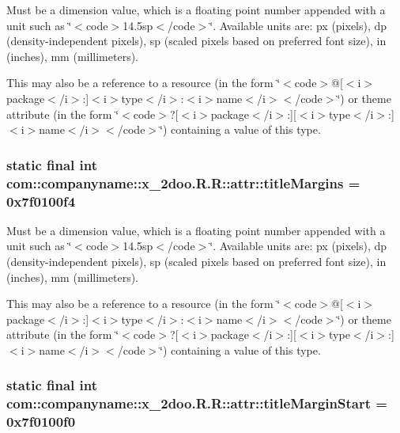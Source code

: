 Must be a dimension value, which is a floating point number appended with a unit such as \char`\"{}$<$code$>$14.5sp$<$/code$>$\char`\"{}. Available units are: px (pixels), dp (density-independent pixels), sp (scaled pixels based on preferred font size), in (inches), mm (millimeters). 

This may also be a reference to a resource (in the form \char`\"{}$<$code$>$@\mbox{[}$<$i$>$package$<$/i$>$:\mbox{]}$<$i$>$type$<$/i$>$:$<$i$>$name$<$/i$>$$<$/code$>$\char`\"{}) or theme attribute (in the form \char`\"{}$<$code$>$?\mbox{[}$<$i$>$package$<$/i$>$:\mbox{]}\mbox{[}$<$i$>$type$<$/i$>$:\mbox{]}$<$i$>$name$<$/i$>$$<$/code$>$\char`\"{}) containing a value of this type. \hypertarget{classcom_1_1companyname_1_1x__2doo_1_1_r_1_1attr_13a8e062a2cd0a3ea42fe3376622f46d}{
\subsubsection[{titleMargins}]{\setlength{\rightskip}{0pt plus 5cm}static final int com::companyname::x\_\-2doo.R.R::attr::titleMargins = 0x7f0100f4}}
\label{classcom_1_1companyname_1_1x__2doo_1_1_r_1_1attr_13a8e062a2cd0a3ea42fe3376622f46d}


Must be a dimension value, which is a floating point number appended with a unit such as \char`\"{}$<$code$>$14.5sp$<$/code$>$\char`\"{}. Available units are: px (pixels), dp (density-independent pixels), sp (scaled pixels based on preferred font size), in (inches), mm (millimeters). 

This may also be a reference to a resource (in the form \char`\"{}$<$code$>$@\mbox{[}$<$i$>$package$<$/i$>$:\mbox{]}$<$i$>$type$<$/i$>$:$<$i$>$name$<$/i$>$$<$/code$>$\char`\"{}) or theme attribute (in the form \char`\"{}$<$code$>$?\mbox{[}$<$i$>$package$<$/i$>$:\mbox{]}\mbox{[}$<$i$>$type$<$/i$>$:\mbox{]}$<$i$>$name$<$/i$>$$<$/code$>$\char`\"{}) containing a value of this type. \hypertarget{classcom_1_1companyname_1_1x__2doo_1_1_r_1_1attr_f6e10ded72b8728c215df0126a226b7e}{
\subsubsection[{titleMarginStart}]{\setlength{\rightskip}{0pt plus 5cm}static final int com::companyname::x\_\-2doo.R.R::attr::titleMarginStart = 0x7f0100f0}}
\label{classcom_1_1companyname_1_1x__2doo_1_1_r_1_1attr_f6e10ded72b8728c215df0126a226b7e}


